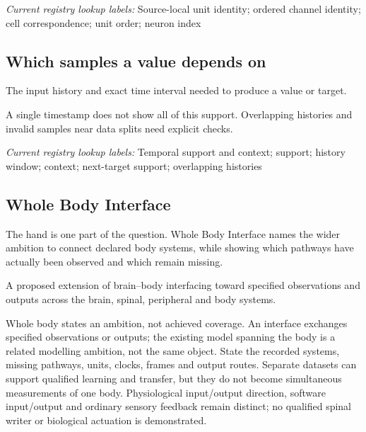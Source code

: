 \noindent\textit{Current registry lookup labels:} Source-local unit identity; ordered channel identity; cell correspondence; unit order; neuron index\par

\begin{samepage}
\subsection*{Which samples a value depends on}
\noindent The input history and exact time interval needed to produce a value or target.\par
\end{samepage}
\begin{samepage}
\noindent A single timestamp does not show all of this support. Overlapping histories and invalid samples near data splits need explicit checks.\par\nopagebreak[4]

\end{samepage}

\noindent\textit{Current registry lookup labels:} Temporal support and context; support; history window; context; next-target support; overlapping histories\par

\subsection*{Whole Body Interface}
\noindent The hand is one part of the question. Whole Body Interface names the wider ambition to connect declared body systems, while showing which pathways have actually been observed and which remain missing.\par
\noindent A proposed extension of brain–body interfacing toward specified observations and outputs across the brain, spinal, peripheral and body systems.\par
\noindent Whole body states an ambition, not achieved coverage. An interface exchanges specified observations or outputs; the existing model spanning the body is a related modelling ambition, not the same object. State the recorded systems, missing pathways, units, clocks, frames and output routes. Separate datasets can support qualified learning and transfer, but they do not become simultaneous measurements of one body. Physiological input/output direction, software input/output and ordinary sensory feedback remain distinct; no qualified spinal writer or biological actuation is demonstrated.\par

